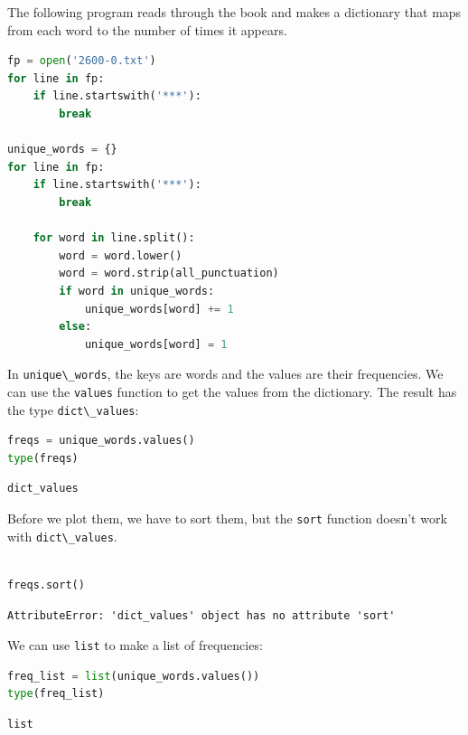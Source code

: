 \documentclass[
]{book}
\newcommand{\passthrough}[1]{#1}
\begin{document}
The following program reads through the book and makes a dictionary that
maps from each word to the number of times it appears.

\begin{lstlisting}[language=Python]
fp = open('2600-0.txt')
for line in fp:
    if line.startswith('***'):
        break

unique_words = {}
for line in fp:
    if line.startswith('***'):
        break
        
    for word in line.split():
        word = word.lower()
        word = word.strip(all_punctuation)
        if word in unique_words:
            unique_words[word] += 1
        else:
            unique_words[word] = 1
\end{lstlisting}

In \passthrough{\lstinline!unique\_words!}, the keys are words and the
values are their frequencies. We can use the
\passthrough{\lstinline!values!} function to get the values from the
dictionary. The result has the type
\passthrough{\lstinline!dict\_values!}:

\begin{lstlisting}[language=Python]
freqs = unique_words.values()
type(freqs)
\end{lstlisting}

\begin{lstlisting}
dict_values
\end{lstlisting}

Before we plot them, we have to sort them, but the
\passthrough{\lstinline!sort!} function doesn't work with
\passthrough{\lstinline!dict\_values!}.

\begin{lstlisting}[language=Python]
%%expect AttributeError

freqs.sort()
\end{lstlisting}

\begin{lstlisting}
AttributeError: 'dict_values' object has no attribute 'sort'
\end{lstlisting}

We can use \passthrough{\lstinline!list!} to make a list of frequencies:

\begin{lstlisting}[language=Python]
freq_list = list(unique_words.values())
type(freq_list)
\end{lstlisting}

\begin{lstlisting}
list
\end{lstlisting}
\end{document}
